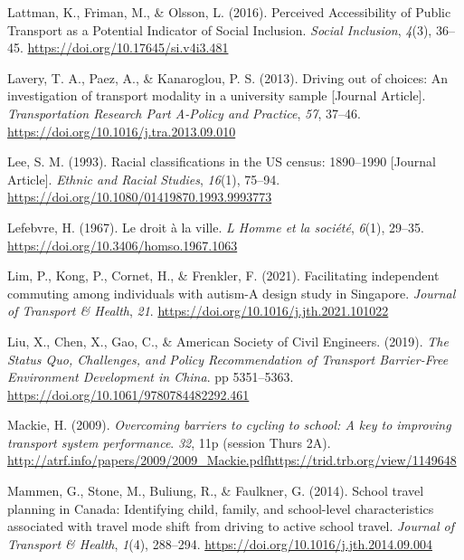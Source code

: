 \documentclass[
  letterpaper,
  DIV=11,
  numbers=noendperiod]{scrartcl}
\newlength{\cslhangindent}
\newenvironment{CSLReferences}[2] %
 {\begin{list}{}{%
  \setlength{\itemindent}{0pt}
  \setlength{\leftmargin}{0pt}
  \setlength{\parsep}{0pt}
  \ifodd #1
   \setlength{\leftmargin}{\cslhangindent}
   \setlength{\itemindent}{-1\cslhangindent}
  \fi
  \setlength{\itemsep}{#2\baselineskip}}}
 {\end{list}}
\begin{document}
\begin{CSLReferences}{1}{0}
Lattman, K., Friman, M., \& Olsson, L. (2016). Perceived {Accessibility}
of {Public Transport} as a {Potential Indicator} of {Social Inclusion}.
\emph{Social Inclusion}, \emph{4}(3), 36--45.
\url{https://doi.org/10.17645/si.v4i3.481}

Lavery, T. A., Paez, A., \& Kanaroglou, P. S. (2013). Driving out of
choices: An investigation of transport modality in a university sample
{[}Journal Article{]}. \emph{Transportation Research Part A-Policy and
Practice}, \emph{57}, 37--46.
\url{https://doi.org/10.1016/j.tra.2013.09.010}

Lee, S. M. (1993). Racial classifications in the US census: 1890--1990
{[}Journal Article{]}. \emph{Ethnic and Racial Studies}, \emph{16}(1),
75--94. \url{https://doi.org/10.1080/01419870.1993.9993773}

Lefebvre, H. (1967). Le droit à la ville. \emph{L Homme et la société},
\emph{6}(1), 29--35. \url{https://doi.org/10.3406/homso.1967.1063}

Lim, P., Kong, P., Cornet, H., \& Frenkler, F. (2021). Facilitating
independent commuting among individuals with autism-{A} design study in
{Singapore}. \emph{Journal of Transport \& Health}, \emph{21}.
\url{https://doi.org/10.1016/j.jth.2021.101022}

Liu, X., Chen, X., Gao, C., \& American Society of Civil Engineers.
(2019). \emph{The {Status Quo}, {Challenges}, and {Policy
Recommendation} of {Transport Barrier-Free Environment Development} in
{China}}. pp 5351--5363. \url{https://doi.org/10.1061/9780784482292.461}

Mackie, H. (2009). \emph{Overcoming barriers to cycling to school: A key
to improving transport system performance}. \emph{32}, 11p (session
Thurs 2A).
\url{http://atrf.info/papers/2009/2009_Mackie.pdfhttps://trid.trb.org/view/1149648}

Mammen, G., Stone, M., Buliung, R., \& Faulkner, G. (2014). School
travel planning in {Canada}: {Identifying} child, family, and
school-level characteristics associated with travel mode shift from
driving to active school travel. \emph{Journal of Transport \& Health},
\emph{1}(4), 288--294. \url{https://doi.org/10.1016/j.jth.2014.09.004}


\end{CSLReferences}
\end{document}
